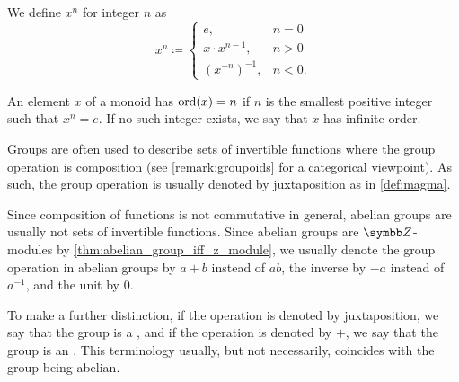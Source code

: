 \begin{definition}
  We define \( x^n \) for integer \( n \) as
  \begin{equation*}
    x^n \coloneqq \begin{cases}
      e, &n = 0 \\
      x \cdot x^{n-1}, &n > 0 \\
      (x^{-n})^{-1}, &n < 0.
    \end{cases}
  \end{equation*}

  An element \( x \) of a monoid has  \( \operatorname{ord}(x) = n \) if \( n \) is the smallest positive integer such that \( x^n = e \). If no such integer exists, we say that \( x \) has infinite order.
\end{definition}

\begin{remark}\label{remark:additive_group}
  Groups are often used to describe sets of invertible functions where the group operation is composition (see \cref{remark:groupoids} for a categorical viewpoint). As such, the group operation is usually denoted by juxtaposition as in \cref{def:magma}.

  Since composition of functions is not commutative in general, abelian groups are usually not sets of invertible functions. Since abelian groups are \( \Z \)-modules by \cref{thm:abelian_group_iff_z_module}, we usually denote the group operation in abelian groups by \( a + b \) instead of \( ab \), the inverse by \( -a \) instead of \( a^{-1} \), and the unit by \( 0 \).

  To make a further distinction, if the operation is denoted by juxtaposition, we say that the group is a , and if the operation is denoted by \( + \), we say that the group is an . This terminology usually, but not necessarily, coincides with the group being abelian.
\end{remark}

